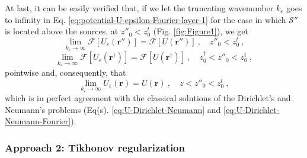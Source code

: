 At last, it can be easily verified that, if we let the truncating wavenumber $k_{\varepsilon}$ 
goes to infinity in Eq. \ref{eq:potential-U-epsilon-Fourier-layer-1} for the case in which 
$\mathcal{S}''$ is located above the sources, at $z''_{0} < z^{t}_{0}$ (Fig. \ref{fig:Figure1}), 
we get 
\begin{equation}
	\lim_{k_{\varepsilon}\to\infty} \mathcal{F} \left[ U_{\varepsilon}(\mathbf{r}'') \right] = 
	\mathcal{F} \left[ U(\mathbf{r}'') \right] \: , \quad z''_{0} < z^{t}_{0} \: ,
	\label{eq:lim-kepsilon-potential-U-epsilon-Fourier-layer}
\end{equation}
\begin{equation}
	\lim_{k_{\varepsilon}\to\infty} \mathcal{F} \left[ U_{\varepsilon}(\mathbf{r}^{\dagger}) \right] = 
	\mathcal{F} \left[ U(\mathbf{r}^{\dagger}) \right] \: , \quad z^{\dagger}_{0} < z''_{0} < z^{t}_{0} \: ,
	\label{eq:lim-kepsilon-potential-U-epsilon-Fourier-dagger}
\end{equation}
pointwise and, consequently, that
\begin{equation}
	\lim_{k_{\varepsilon}\to\infty} U_{\varepsilon}(\mathbf{r}) = 
	U(\mathbf{r}) \: , \quad z < z''_{0} < z^{t}_{0} \: ,
	\label{eq:lim-kepsilon-potential-U-epsilon-space}
\end{equation}
which is in perfect agreement with the classical solutions of the Dirichlet's and Neumann's
problems (Eq(s). \ref{eq:U-Dirichlet-Neumann} and \ref{eq:U-Dirichlet-Neumann-Fourier}).

\subsubsection{Approach 2: Tikhonov regularization}

